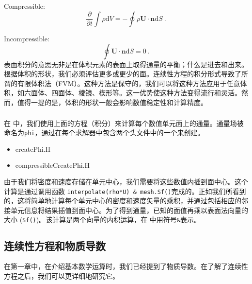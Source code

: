 \documentclass[MathematicsNumericsDerivationsAndOpenFOAM.tex]{subfiles}
\begin{document}
	Compressible:
%
%
\begin{equation}
 \boxed{
 \frac{\partial}{\partial t} \int \rho \mathrm{d}V=
 -   \oint \rho \textbf{U} \cdot \textbf{n} \mathrm{d}S
   } ~.
\end{equation}
%
%

	Incompressible:
%
%
\begin{equation}
 \boxed{
    \oint \textbf{U} \cdot \textbf{n} \mathrm{d}S = 0
   } ~.
\end{equation}
%
%
	表面积分的意思无非是在体积元素的表面上取得通量的平衡；什么是进去和出来。根据体积的形状，我们必须评估更多或更少的面。连续性方程的积分形式导致了所谓的有限体积法（FVM）。这种方法是保守的，我们可以将这种方法应用于任意体积，如六面体、四面体、棱镜、楔形等。这一优势使这种方法变得流行和灵活。然而，值得一提的是，体积的形状一般会影响数值稳定性和计算精度。
%
%
%
%
%
\subsubsection{\OF}
%
%
在 \OF 中，我们使用上面的方程（积分）来计算每个数值单元面上的通量。通量场被命名为\texttt{phi}，通过在每个求解器中包含两个头文件中的一个来创建。
%
%
\begin{itemize}
 \item createPhi.H
 \item compressibleCreatePhi.H
\end{itemize}
%
%

	由于我们将密度和速度存储在单元中心，我们需要将这些数值内插到面中心。这个计算是通过调用函数  \texttt{interpolate(rho*U) \& mesh.Sf()}完成的。正如我们所看到的，这将简单地计算每个单元中心的密度和速度矢量的乘积，并通过包括相应的邻接单元信息将结果插值到面中心。为了得到通量，已知的面值再乘以表面法向量的大小 (\texttt{Sf()})。该计算是两个向量的内积运算，在 \OF 中用符号\texttt{\&}表示。
%
%
%
%
%
\subsection{连续性方程和物质导数}
%
%
在第一章中，在介绍基本数学运算时，我们已经提到了物质导数。在了解了连续性方程之后，我们可以更详细地研究它。
\end{document}
